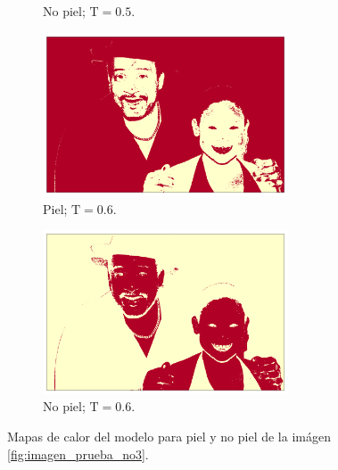 \begin{figure}[ht!]
\begin{subfigure}{0.4\textwidth}
        \caption{No piel; $\text{T} = 0.5$.}
    \end{subfigure}
    \begin{subfigure}{0.4\textwidth}
        \centering
        \includegraphics[width=0.8\textwidth]{../figures/image3/image_03_treshskin_60percent.png}
        \caption{Piel; $\text{T} = 0.6$.}
    \end{subfigure}
    \hspace{1cm}
    \begin{subfigure}{0.4\textwidth}
        \centering
        \includegraphics[width=0.8\textwidth]{../figures/image3/image_03_treshbg_60percent.png}
        \caption{No piel; $\text{T} = 0.6$.}
    \end{subfigure}
    \caption{Mapas de calor del modelo para piel y no piel de la imágen \cref{fig:imagen_prueba_no3}.}
    \label{fig:model_applied_no3}
\end{figure}


